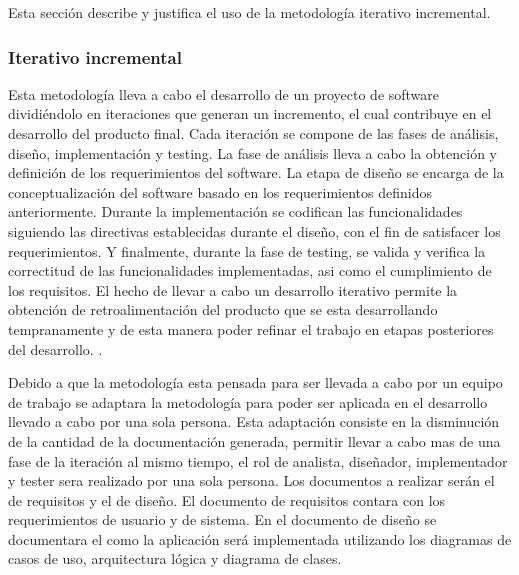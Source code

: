 \documentclass[11pt,letterpaper]{article}
\begin{document}
Esta sección describe y justifica el uso de la metodología iterativo incremental.
\subsubsection{Iterativo incremental}

Esta metodología lleva a cabo el desarrollo de un proyecto de software dividiéndolo en iteraciones que generan un incremento, el cual contribuye en el desarrollo del producto final. Cada iteración se compone de las fases de análisis, diseño, implementación y testing. La fase de análisis lleva a cabo la obtención y definición de los requerimientos del software. La etapa de diseño se encarga de la conceptualización del software basado en los requerimientos definidos anteriormente. Durante la implementación se codifican las funcionalidades siguiendo las directivas establecidas durante el diseño, con el fin de satisfacer los requerimientos. Y finalmente, durante la fase de testing, se valida y verifica la correctitud de las funcionalidades implementadas, asi como el cumplimiento de los requisitos. El hecho de llevar a cabo un desarrollo iterativo permite la obtención de retroalimentación del producto que se esta desarrollando tempranamente y de esta manera poder refinar el trabajo en etapas posteriores del desarrollo. \cite{Victor2003, Mitchell2009, Martin1999,Alshamrani2015}.

Debido a que la metodología esta pensada para ser llevada a cabo por un equipo de trabajo se adaptara la metodología para poder ser aplicada en el desarrollo llevado a cabo por una sola persona. Esta adaptación consiste en la disminución de la cantidad de la documentación generada, permitir llevar a cabo mas de una fase de la iteración al mismo tiempo, el rol de analista, diseñador, implementador y tester sera realizado por una sola persona. Los documentos a realizar serán el de requisitos y el de diseño. El documento de requisitos contara con los requerimientos de usuario y de sistema. En el documento de diseño se documentara el como la aplicación será implementada utilizando los diagramas de casos de uso, arquitectura lógica y diagrama de clases.
\end{document}
